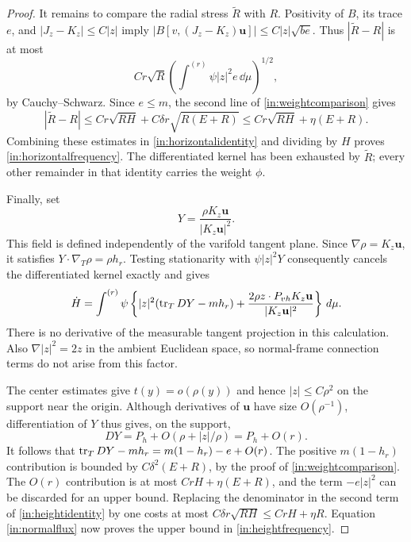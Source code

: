 \begin{proof}
It remains to compare the radial stress $\widetilde R$ with $R$.
Positivity of $B$, its trace $e$, and $|J_z-K_z|\leq C|z|$ imply
$|B[v,(J_z-K_z)\mathbf u]|\leq C|z|\sqrt{be}$.  Thus
$|\widetilde R-R|$ is at most
\begin{equation}\label{in:radialreplacement}
 Cr\sqrt R\left(\int^{(r)}\psi|z|^2e\,\dd\mu\right)^{1/2},
\end{equation}
by Cauchy--Schwarz.  Since $e\leq m$, the second line of
\eqref{in:weightcomparison} gives
\[
 |\widetilde R-R|
 \leq Cr\sqrt{RH}+C\delta r\sqrt{R(E+R)}
 \leq Cr\sqrt{RH}+\eta(E+R).
\]
Combining these estimates in \eqref{in:horizontalidentity} and dividing
by $H$ proves \eqref{in:horizontalfrequency}.  The differentiated
kernel has been exhausted by $\widetilde R$; every other remainder in
that identity carries the weight $\phi$.

Finally, set
\[
 Y=\frac{\rho K_z\mathbf u}{|K_z\mathbf u|^2}.
\]
This field is defined independently of the varifold tangent plane.
Since $\nabla\rho=K_z\mathbf u$, it satisfies
$Y\cdot\nabla_T\rho=\rho h_r$.  Testing stationarity with
$\psi|z|^2Y$ consequently cancels the differentiated kernel exactly
and gives
\begin{equation}\label{in:heightidentity}
 \dot H=\int^{(r)}\psi\left\{
 |z|^2(\operatorname{tr}_T DY-mh_r)
 +\frac{2\rho z\cdot P_{vh}K_z\mathbf u}{|K_z\mathbf u|^2}
                         \right\}\,\mathop{}\!d\mu.
\end{equation}
There is no derivative of the measurable tangent projection in this
calculation.  Also $\nabla|z|^2=2z$ in the ambient Euclidean space,
so normal-frame connection terms do not arise from this factor.

The center estimates give $t(y)=o(\rho(y))$ and hence
$|z|\leq C\rho^2$ on the support near the origin.  Although
derivatives of $\mathbf u$ have size $O(\rho^{-1})$, differentiation
of $Y$ thus gives, on the support,
\[
 DY=P_h+O(\rho+|z|/\rho)=P_h+O(r).
\]
It follows that $\operatorname{tr}_TDY-mh_r=m(1-h_r)-e+O(r)$.
The positive $m(1-h_r)$ contribution is bounded by
$C\delta^2(E+R)$, by the proof of \eqref{in:weightcomparison}.
The $O(r)$ contribution is at most $CrH+\eta(E+R)$, and the term
$-e|z|^2$ can be discarded for an upper bound.  Replacing the
denominator in the second term of \eqref{in:heightidentity} by one
costs at most $C\delta r\sqrt{RH}\leq CrH+\eta R$.
Equation \eqref{in:normalflux} now proves the upper bound in
\eqref{in:heightfrequency}.


\end{proof}
